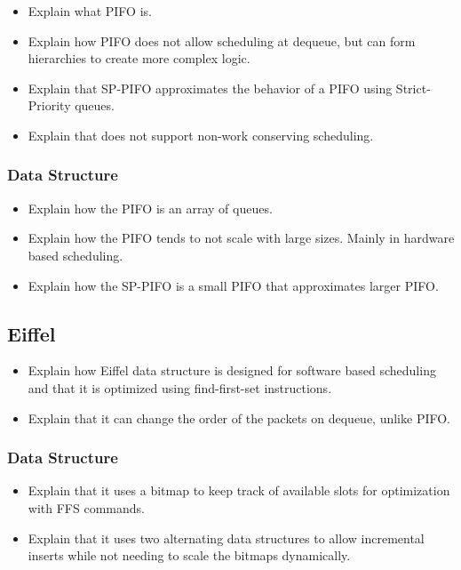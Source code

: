 \documentclass[sigconf, nonacm]{acmart}
\begin{document}
\begin{itemize}
  \item Explain what PIFO\cite{Sivaraman2016} is.
  \item Explain how PIFO does not allow scheduling at dequeue, but can form hierarchies to create more complex logic.
  \item Explain that SP-PIFO\cite{Alcoz2020} approximates the behavior of a PIFO using Strict-Priority queues.
  \item Explain that does not support non-work conserving scheduling.
\end{itemize}


\subsubsection{Data Structure}

\begin{itemize}
  \item Explain how the PIFO is an array of queues.
  \item Explain how the PIFO tends to not scale with large sizes. Mainly in hardware based scheduling.
  \item Explain how the SP-PIFO is a small PIFO that approximates larger PIFO.
\end{itemize}


\subsection{Eiffel}

\begin{itemize}
  \item Explain how Eiffel\cite{Saeed2019} data structure is designed for software based scheduling and that it is optimized using find-first-set instructions.
  \item Explain that it can change the order of the packets on dequeue, unlike PIFO.
\end{itemize}


\subsubsection{Data Structure}

\begin{itemize}
  \item Explain that it uses a bitmap to keep track of available slots for optimization with FFS commands.
  \item Explain that it uses two alternating data structures to allow incremental inserts while not needing to scale the bitmaps dynamically.
\end{itemize}
\end{document}

